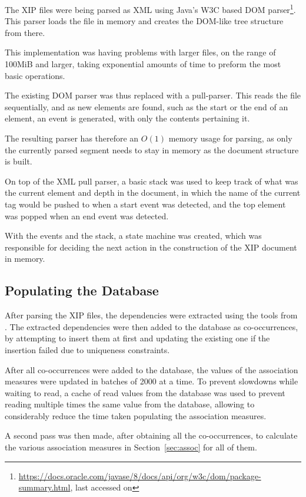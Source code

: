 The \ac{XIP} files were being parsed as XML using Java's W3C based \ac{DOM}
parser\footnote{\url{https://docs.oracle.com/javase/8/docs/api/org/w3c/dom/package-summary.html},
last accessed on }. This parser loads the file in memory and
creates the \ac{DOM}-like tree structure from there.

This implementation was having problems with larger files, on the range of
100MiB and larger, taking exponential amounts of time to preform the most basic
operations.

The existing \ac{DOM} parser was thus replaced with a pull-parser. This reads
the file sequentially, and as new elements are found, such as the start or the
end of an element, an event is generated, with only the contents pertaining it.

The resulting parser has therefore an $O(1)$ memory usage for parsing, as only
the currently parsed segment needs to stay in memory as the document structure
is built.

On top of the XML pull parser, a basic stack was used to keep track of what was
the current element and depth in the document, in which the name of the current
tag would be pushed to when a start event was detected, and the top element was
popped when an end event was detected.

With the events and the stack, a state machine was created, which was
responsible for deciding the next action in the construction of the XIP document
in memory.

\subsection{Populating the Database}

After parsing the \ac{XIP} files, the dependencies were extracted using the
tools from \cite{correia2015syntax}. The extracted dependencies were then added
to the database as co-occurrences, by attempting to insert them at first and
updating the existing one if the insertion failed due to uniqueness constraints.

After all co-occurrences were added to the database, the values of the
association measures were updated in batches of 2000 at a time. To prevent
slowdowns while waiting to read, a cache of read values from the database was
used to prevent reading multiple times the same value from the database,
allowing to considerably reduce the time taken populating the association
measures.

A second pass was then made, after obtaining all the co-occurrences, to
calculate the various association measures in Section~\ref{sec:assoc} for all of
them.


